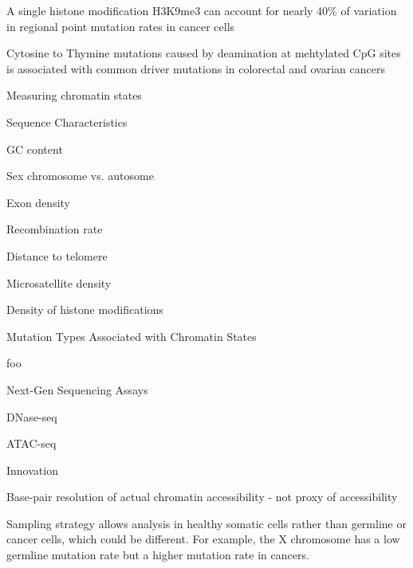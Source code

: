 \begin{outline}
\begin{outline}
\begin{outline}
			\item A single histone modification H3K9me3 can account for nearly 40\% of variation in regional point mutation rates in cancer cells \parencite{schuster-bockler_chromatin_2012}
			\item Cytosine to Thymine mutations caused by deamination at mehtylated CpG sites is associated with common driver mutations in colorectal and ovarian cancers \parencite{gold_somatic_2017}
		\end{outline}
		\item Measuring chromatin states
		\begin{outline}
			\item Sequence Characteristics \parencite{makova_effects_2015}
			\begin{outline}
				\item GC content
				\item Sex chromosome vs. autosome
				\item Exon density
				\item Recombination rate
				\item Distance to telomere
				\item Microsatellite density
				\item Density of histone modifications
			\end{outline}
			\item Mutation Types Associated with Chromatin States
			\begin{outline}
				\item foo
			\end{outline}
			\item Next-Gen Sequencing Assays
			\begin{outline}
				\item DNase-seq
				\item ATAC-seq
			\end{outline}
		\end{outline}
	\end{outline}
	\item Innovation
	\begin{outline}
		\item Base-pair resolution of actual chromatin accessibility - not proxy of accessibility
		\item Sampling strategy allows analysis in healthy somatic cells rather than germline or cancer cells, which could be different. For example, the X chromosome has a low germline mutation rate but a higher mutation rate in cancers. \parencite{makova_effects_2015}

\end{outline}
\end{outline}
